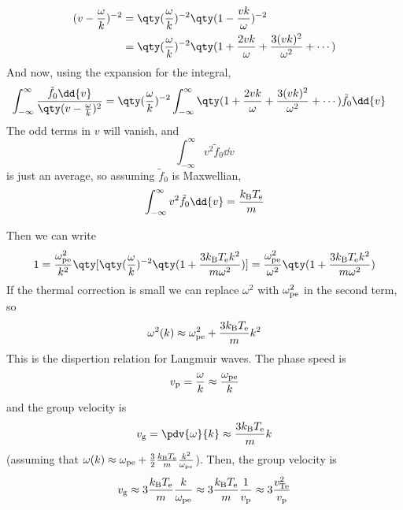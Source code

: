 \documentclass{book}         		                %
\begin{document}
\begin{align*} (v - \frac{\omega}{k})^{-2} &= \qty( \frac{\omega}{k} )^{-2} \qty( 1 - \frac{v k}{\omega})^{-2} \\
&= \qty( \frac{\omega}{k} )^{-2} \qty( 1 + \frac{2 v k}{\omega} + \frac{3(vk)^2}{\omega^2} + \cdots )
\end{align*}
And now, using the expansion for the integral,
\begin{align*}
  \int_{-\infty}^{\infty} \frac{\tilde{f}_0 \dd{v}}{\qty( v - \frac{\omega}{k})^2} &= \qty( \frac{\omega}{k} )^{-2} \int_{- \infty}^{\infty} \qty( 1 + \frac{2 v k}{\omega} + \frac{3(vk)^2}{\omega^2} + \cdots ) \tilde{f}_0 \dd{v}
\end{align*}
The odd terms in $v$ will vanish, and 
\[ \int_{-\infty}^{\infty} v^2 \tilde{f}_0 \dd{v} \]
is just an average, so assuming $\tilde{f}_0$ is Maxwellian,
\[ \int_{-\infty}^{\infty} v^2 \tilde{f}_0 \dd{v} = \frac{k_{\rm B}T_{\rm e}}{m}\]

Then we can write
\[ 1 = \frac{\omega_{\rm pe}^2}{k^2} \qty[ \qty(\frac{\omega}{k})^{-2} \qty(1+ \frac{3 k_{\rm B} T_{\rm e} k^2}{m \omega^2})] = \frac{\omega_{\rm pe}^2}{\omega^2} \qty( 1+ \frac{3 k_{\rm B} T_{\rm e} k^2}{m \omega^2} )\]
If the thermal correction is small we can replace $\omega^2$ with $\omega_{\rm pe}^2$ in the second term, so
\begin{equation}
  \label{eq:32}
  \omega^2(k) \approx \omega_{\rm pe}^2 + \frac{3 k_{\rm B} T_{\rm e}}{m} k^2
\end{equation}
This is the dispertion relation for Langmuir waves. The phase speed is 
\[ v_{\rm p} = \frac{\omega}{k} \approx \frac{\omega_{\rm pe}}{k} \]
and the group velocity is
\[ v_{\rm g} = \pdv{\omega}{k} \approx \frac{3 k_{\rm B} T_{\rm e}}{m}
k \] (assuming that $\omega(k) \approx \omega_{\rm pe} + \frac{3}{2}
\frac{k_{\rm B} T_{\rm e}}{m} \frac{k^2}{\omega_{\rm pe}}$). Then, the
group velocity is
\[ v_{\rm g} \approx 3 \frac{k_{\rm B}T_{\rm e}}{m}
\frac{k}{\omega_{\rm pe}} \approx 3 \frac{k_{\rm B} T_{\rm e}}{m}
\frac{1}{v_{\rm p}} \approx 3 \frac{v_{\rm Te}^2}{v_{\rm p}} \]
\end{document}
